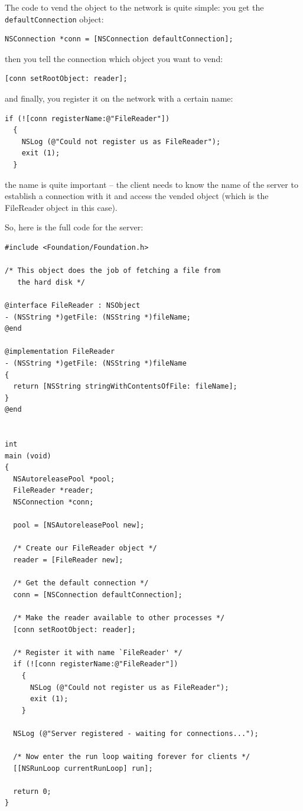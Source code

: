 \documentclass[a4paper]{article}
\begin{document}
The code to vend the object to the network is quite simple: you get
the \texttt{defaultConnection} object:
\begin{verbatim}
NSConnection *conn = [NSConnection defaultConnection];
\end{verbatim}
then you tell the connection which object you want to vend:
\begin{verbatim}
[conn setRootObject: reader];
\end{verbatim}
and finally, you register it on the network with a certain name:
\begin{verbatim}
if (![conn registerName:@"FileReader"])
  {
    NSLog (@"Could not register us as FileReader");
    exit (1);
  }
\end{verbatim}
the name is quite important -- the client needs to know the name of
the server to establish a connection with it and access the vended
object (which is the FileReader object in this case).

So, here is the full code for the server:
\begin{verbatim}
#include <Foundation/Foundation.h>

/* This object does the job of fetching a file from 
   the hard disk */

@interface FileReader : NSObject
- (NSString *)getFile: (NSString *)fileName;
@end

@implementation FileReader
- (NSString *)getFile: (NSString *)fileName
{
  return [NSString stringWithContentsOfFile: fileName];
}
@end


int 
main (void)
{
  NSAutoreleasePool *pool;
  FileReader *reader;
  NSConnection *conn;
  
  pool = [NSAutoreleasePool new];

  /* Create our FileReader object */
  reader = [FileReader new];

  /* Get the default connection */
  conn = [NSConnection defaultConnection];

  /* Make the reader available to other processes */
  [conn setRootObject: reader];

  /* Register it with name `FileReader' */
  if (![conn registerName:@"FileReader"]) 
    {
      NSLog (@"Could not register us as FileReader");
      exit (1);
    }
  
  NSLog (@"Server registered - waiting for connections...");

  /* Now enter the run loop waiting forever for clients */
  [[NSRunLoop currentRunLoop] run];
  
  return 0;
}
\end{verbatim}
\end{document}
